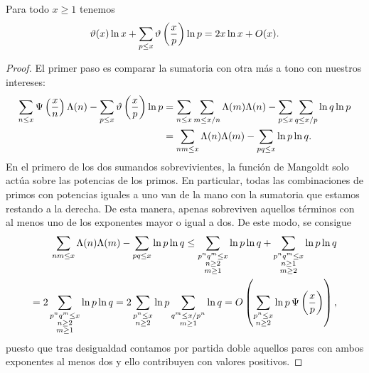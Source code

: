 \begin{lemma}
  \label{lem:theta-2xlnx-ox}
  Para todo \(x \geq 1\) tenemos
  \[
    \vartheta(x)\ln x
    + \sum_{p \leq x} \vartheta\left( \frac{x}{p} \right)\ln p
    = 2x\ln x + O(x).
  \]
\end{lemma}

\begin{proof}
  El primer paso es comparar la sumatoria con otra m\'as a tono con nuestros intereses:
  \begin{align*}
    \sum_{n \leq x} \Psi \left( \frac{x}{n} \right) \Lambda(n)
    - \sum_{p \leq x} \vartheta \left( \frac{x}{p} \right) \ln p
    &= \sum_{n \leq x} \sum_{m \leq x/n} \Lambda(m) \Lambda(n)
    - \sum_{p \leq x} \sum_{q \leq x / p} \ln q \ln p \\
    &= \sum_{nm \leq x} \Lambda(n) \Lambda(m)
    - \sum_{pq \leq x} \ln p \ln q.
  \end{align*}
  En el primero de los dos sumandos sobrevivientes,
  la funci\'on de Mangoldt solo act\'ua sobre las potencias de los primos.
  En particular, todas las combinaciones de primos con potencias iguales a uno
  van de la mano con la sumatoria que estamos restando a la derecha.
  De esta manera, apenas sobreviven aquellos t\'erminos
  con al menos uno de los exponentes mayor o igual a dos.
  De este modo, se consigue
  \begin{align*}
    \sum_{nm \leq x} \Lambda(n) \Lambda(m)
    - \sum_{pq \leq x} \ln p \ln q
    \leq \sum_{\substack{p^n q^m \leq x \\ n \geq 2 \\ m \geq 1}} \ln p \ln q
    + \sum_{\substack{p^n q^m \leq x \\ n \geq 1 \\ m \geq 2}} \ln p \ln q \\
    = 2 \sum_{\substack{p^n q^m \leq x \\ n \geq 2 \\ m \geq 1}} \ln p \ln q
    = 2 \sum_{\substack{p^n \leq x \\ n \geq 2}} \ln p \sum_{\substack{q^m \leq x / p^n \\ m \geq 1}} \ln q
    = O\left( \sum_{\substack{p^n \leq x \\ n \geq 2}} \ln p \, \Psi\left( \frac{x}{p} \right) \right),
  \end{align*}
  puesto que tras desigualdad contamos por partida doble
  aquellos pares con ambos exponentes al menos dos y ello contribuyen con valores positivos.

\end{proof}
